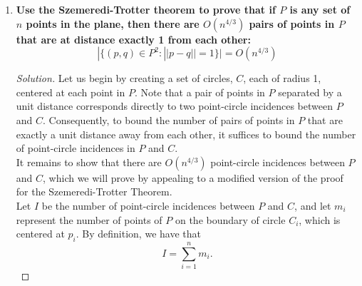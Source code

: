 \documentclass[11pt]{article}
\newenvironment{solution}
  {\renewcommand\qedsymbol{$\blacksquare$}\begin{proof}[Solution]}
  {\end{proof}}
\begin{document}
\begin{enumerate}
\begin{solution}
    For our base case(s), note that $d(q_0) = 1$ holds by definition. For the inductive step, assume that $d(q_k) = \Omega(1)$ for some $k \in \mathbb{N}$. We want to show that $d(q_{k+1}) = \Omega(1).$ 
    
    By definition, \begin{align*} d(q_{k+1}) &= 2^{-\log_2 3} \left( d\left(q_{k}^{\ulcorner}\right) + d(q_{k}^{\llcorner}) + d(q_{k}^{\lrcorner}) + d\left(q_{k}^{\urcorner}\right)\right) \\
    &= \frac{1}{3} (3 \Omega(1) + 0) = \Omega(1) \end{align*}

    and so $d(q_{k+1}) = \Omega(1)$, as desired. Furthermore, this is indeed a $\log_2 3$-gale. \\
    
    Thus, by induction, we know that the above gale is a $\log_2 3$-gale $d$ satisfying the property that for all points $p$ in the right Sierpinski triangle, there is an infinite sequence $q_0 \supset q_1 \dots $ of nested dyadic squares such that $p \in \bigcap_{n \in \mathbb{N}} q_n$ and $d(q_n) = \Omega(1)$.
    \end{solution}

    \newpage
    
    \item\textbf{Use the Szemeredi-Trotter theorem to prove that if $P$ is any set of $n$ points in the plane, then there are $O(n^{4/3})$ pairs of points in $P$ that are at distance exactly 1 from each other:}
    \[|\{(p,q) \in P^2:||p-q||=1\}|=O(n^{4/3})\]

    \begin{solution} Let us begin by creating a set of circles, $C$, each of radius 1, centered at each point in $P$. Note that a pair of points in $P$ separated by a unit distance corresponds directly to two point-circle incidences between $P$ and $C$. Consequently, to bound the number of pairs of points in $P$ that are exactly a unit distance away from each other, it suffices to bound the number of point-circle incidences in $P$ and $C$. \\

    It remains to show that there are $O(n^{4/3})$ point-circle incidences between $P$ and $C$, which we will prove by appealing to a modified version of the proof for the Szemeredi-Trotter Theorem. \\

    Let $I$ be the number of point-circle incidences between $P$ and $C$, and let $m_i$ represent the number of points of $P$ on the boundary of circle $C_i$, which is centered at $p_i$. By definition, we have that \[ I = \sum\limits_{i=1}^n m_i.\]


\end{solution}
\end{enumerate}
\end{document}
